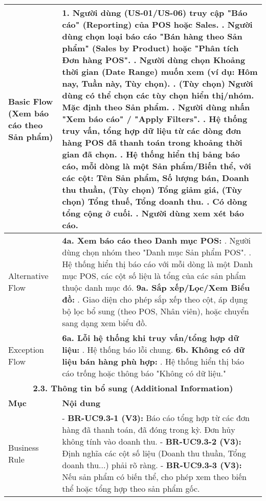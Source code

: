 \begin{longtable}{|m{4cm}|p{11cm}|}
\hline
Basic Flow (Xem báo cáo theo Sản phẩm) & 1. Người dùng (US-01/US-06) truy cập "Báo cáo" (Reporting) của POS hoặc Sales. \newline 2. Người dùng chọn loại báo cáo "Bán hàng theo Sản phẩm" (Sales by Product) hoặc "Phân tích Đơn hàng POS". \newline 3. Người dùng chọn Khoảng thời gian (Date Range) muốn xem (ví dụ: Hôm nay, Tuần này, Tùy chọn). \newline 4. (Tùy chọn) Người dùng có thể chọn các tùy chọn hiển thị/nhóm. Mặc định theo Sản phẩm. \newline 5. Người dùng nhấn "Xem báo cáo" / "Apply Filters". \newline 6. Hệ thống truy vấn, tổng hợp dữ liệu từ các dòng đơn hàng POS đã thanh toán trong khoảng thời gian đã chọn. \newline 7. Hệ thống hiển thị bảng báo cáo, mỗi dòng là một Sản phẩm/Biến thể, với các cột: Tên Sản phẩm, Số lượng bán, Doanh thu thuần, (Tùy chọn) Tổng giảm giá, (Tùy chọn) Tổng thuế, Tổng doanh thu. \newline 8. Có dòng tổng cộng ở cuối. \newline 9. Người dùng xem xét báo cáo. \\
\hline
Alternative Flow & \textbf{4a. Xem báo cáo theo Danh mục POS:} \newline    1. Người dùng chọn nhóm theo "Danh mục Sản phẩm POS". \newline    2. Hệ thống hiển thị báo cáo với mỗi dòng là một Danh mục POS, các cột số liệu là tổng của các sản phẩm thuộc danh mục đó. \newline \textbf{9a. Sắp xếp/Lọc/Xem Biểu đồ:} \newline    1. Giao diện cho phép sắp xếp theo cột, áp dụng bộ lọc bổ sung (theo POS, Nhân viên), hoặc chuyển sang dạng xem biểu đồ. \\
\hline
Exception Flow & \textbf{6a. Lỗi hệ thống khi truy vấn/tổng hợp dữ liệu:} \newline    1. Hệ thống báo lỗi chung. \newline \textbf{6b. Không có dữ liệu bán hàng phù hợp:} \newline    1. Hệ thống hiển thị báo cáo trống hoặc thông báo "Không có dữ liệu." \\
\hline
\multicolumn{2}{|c|}{\textbf{2.3. Thông tin bổ sung (Additional Information)}} \\
\hline
\textbf{Mục} & \textbf{Nội dung} \\
\hline
Business Rule & - \textbf{BR-UC9.3-1 (V3):} Báo cáo tổng hợp từ các đơn hàng đã thanh toán, đã đóng trong kỳ. Đơn hủy không tính vào doanh thu. \newline - \textbf{BR-UC9.3-2 (V3):} Định nghĩa các cột số liệu (Doanh thu thuần, Tổng doanh thu...) phải rõ ràng. \newline - \textbf{BR-UC9.3-3 (V3):} Nếu sản phẩm có biến thể, cho phép xem theo biến thể hoặc tổng hợp theo sản phẩm gốc. \\

\end{longtable}
